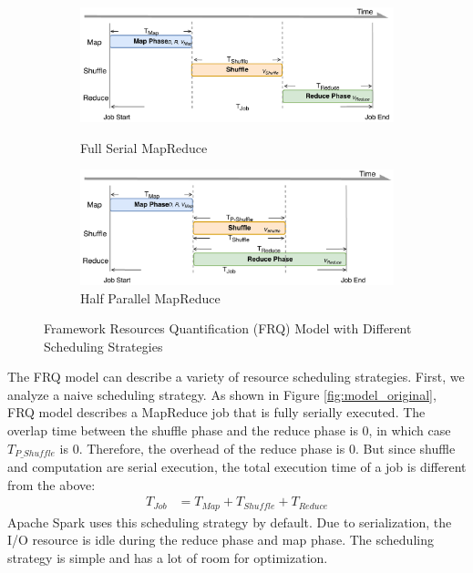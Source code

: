 {\begin{figure}
	\centering
	\begin{minipage}[hb]{\linewidth}
		\begin{subfigure}{\linewidth}
			\begin{minipage}{\linewidth}
				\includegraphics[width=\linewidth]{fig/model_original}
				\caption{\color{blue}Full Serial MapReduce}
				\label{fig:model_original}
			\end{minipage}
			\begin{minipage}{\linewidth}
				\includegraphics[width=\linewidth]{fig/model_hadoop}
				\caption{\color{blue}Half Parallel MapReduce}
				\label{fig:model_hadoop}
			\end{minipage}
		\end{subfigure}
		\caption{\color{blue}Framework Resources Quantification (FRQ) Model with Different Scheduling Strategies}
		\label{fig:model_strategies}
	\end{minipage}
\end{figure}

The FRQ model can describe a variety of resource scheduling strategies. First, we analyze a naive scheduling strategy. As shown in Figure \ref{fig:model_original}, FRQ model describes a MapReduce job that is fully serially executed. The overlap time between the shuffle phase and the reduce phase is \(0\), in which case \(T_{P\_Shuffle}\) is \(0\). Therefore, the overhead of the reduce phase is 0. But since shuffle and computation are serial execution, the total execution time of a job is different from the above:
\begin{equation}
\label{equation_Tjob2}
\begin{aligned}
    T_{Job} &= T_{Map} + T_{Shuffle} + T_{Reduce}
\end{aligned}
\end{equation}
Apache Spark uses this scheduling strategy by default. Due to serialization, the I/O resource is idle during the reduce phase and map phase. The scheduling strategy is simple and has a lot of room for optimization.

}
